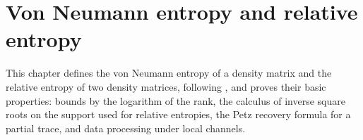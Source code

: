 
\chapter{Von Neumann entropy and relative entropy}\label{ch:entropy}

This chapter defines the von Neumann entropy of a density matrix and the
relative entropy of two density matrices, following
\cite[Chapter~8]{Wolf2012Quantum}, and proves their basic properties: bounds
by the logarithm of the rank, the calculus of inverse square roots on the
support used for relative entropies, the Petz recovery formula for a partial
trace, and data processing under local channels.




